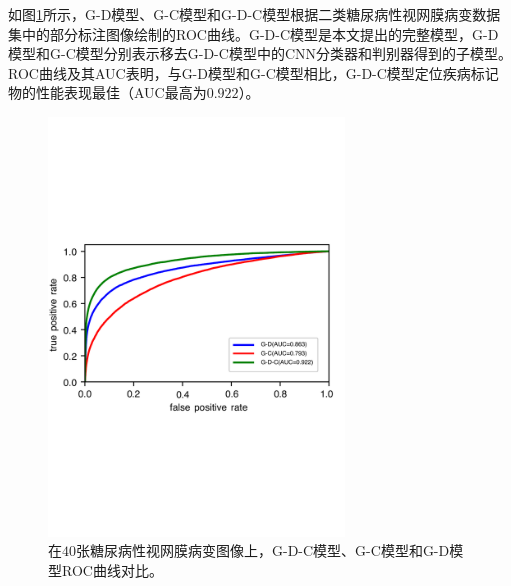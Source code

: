 如图\ref{fig:roc_u_d_u_c_u_d_c_components}所示，G-D模型、G-C模型和G-D-C模型根据二类糖尿病性视网膜病变数据集中的部分标注图像绘制的ROC曲线。G-D-C模型是本文提出的完整模型，G-D模型和G-C模型分别表示移去G-D-C模型中的CNN分类器和判别器得到的子模型。ROC曲线及其AUC表明，与G-D模型和G-C模型相比，G-D-C模型定位疾病标记物的性能表现最佳（AUC最高为$0.922$）。
\begin{figure}[H]
	\centering
	\includegraphics[width=0.7\textwidth]{figure/ROC_u_d_u_c_u_d_c_components.pdf}
	\caption[G-D-C模型、G-C模型和G-D模型ROC曲线对比]{在$40$张糖尿病性视网膜病变图像上，G-D-C模型、G-C模型和G-D模型ROC曲线对比。}
	\label{fig:roc_u_d_u_c_u_d_c_components}
\end{figure}
\endinput
